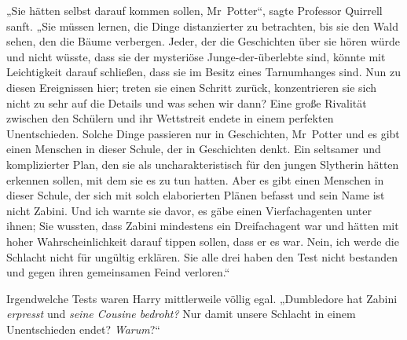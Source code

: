 „Sie hätten selbst darauf kommen sollen, Mr~Potter“, sagte Professor Quirrell sanft.
„Sie müssen lernen, die Dinge distanzierter zu betrachten, bis sie den Wald sehen, den die Bäume verbergen. Jeder, der die Geschichten über sie hören würde und nicht wüsste, dass sie der mysteriöse Junge-der-überlebte sind, könnte mit Leichtigkeit darauf schließen, dass sie im Besitz eines Tarnumhanges sind. Nun zu diesen Ereignissen hier; treten sie einen Schritt zurück, konzentrieren sie sich nicht zu sehr auf die Details und was sehen wir dann? Eine große Rivalität zwischen den Schülern und ihr Wettstreit endete in einem perfekten Unentschieden. Solche Dinge passieren nur in Geschichten, Mr~Potter und es gibt einen Menschen in dieser Schule, der in Geschichten denkt. Ein seltsamer und komplizierter Plan, den sie als uncharakteristisch für den jungen Slytherin hätten erkennen sollen, mit dem sie es zu tun hatten. Aber es gibt einen Menschen in dieser Schule, der sich mit solch elaborierten Plänen befasst und sein Name ist nicht Zabini. Und ich warnte sie davor, es gäbe einen Vierfachagenten unter ihnen; Sie wussten, dass Zabini mindestens ein Dreifachagent war und hätten mit hoher Wahrscheinlichkeit darauf tippen sollen, dass er es war. Nein, ich werde die Schlacht nicht für ungültig erklären. Sie alle drei haben den Test nicht bestanden und gegen ihren gemeinsamen Feind verloren.“

Irgendwelche Tests waren Harry mittlerweile völlig egal.
„Dumbledore hat Zabini \emph{erpresst} und \emph{seine Cousine bedroht?} Nur damit unsere Schlacht in einem Unentschieden endet? \emph{Warum}?“


